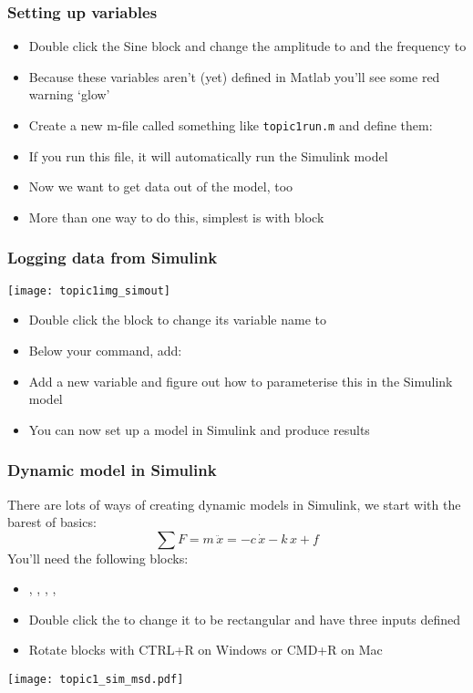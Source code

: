\documentclass[9pt]{beamer-control}
\begin{document}
\begin{frame}
\frametitle{Setting up variables}
\begin{itemize}
\item
Double click the Sine block and change the amplitude to  and the frequency to 
\item
Because these variables aren't (yet) defined in Matlab you'll see some red warning `glow'
\item
Create a new m-file called something like \texttt{topic1run.m} and define them:
\end{itemize}
\begin{itemize}
\item
If you run this file, it will automatically run the Simulink model
\item
Now we want to get data out of the model, too
\item
More than one way to do this, simplest is with  block
\end{itemize}

\end{frame}

\begin{frame}
\frametitle{Logging data from Simulink}
\centering
\texttt{[image: topic1img\_simout]}
\begin{itemize}
\item
Double click the  block to change its variable name to 
\item
Below your  command, add:
\end{itemize}
\begin{itemize}
\item
Add a new variable  and figure out how to parameterise this in the Simulink model
\item
You can now set up a model in Simulink and produce results
\end{itemize}

\end{frame}


\begin{frame}
\frametitle{Dynamic model in Simulink}
There are lots of ways of creating dynamic models in Simulink, we start with the barest of basics:
\[
   \sum F = m\,\ddot x = - c\,\dot x - k\,x + f
\]
You'll need the following blocks:
\begin{itemize}
\item {}, , , , 
\item Double click the  to change it to be rectangular and have three inputs defined \CODE{+--}
\item Rotate blocks with CTRL+R on Windows or CMD+R on Mac
\end{itemize}

\centering
\texttt{[image: topic1\_sim\_msd.pdf]}

\end{frame}
\end{document}
